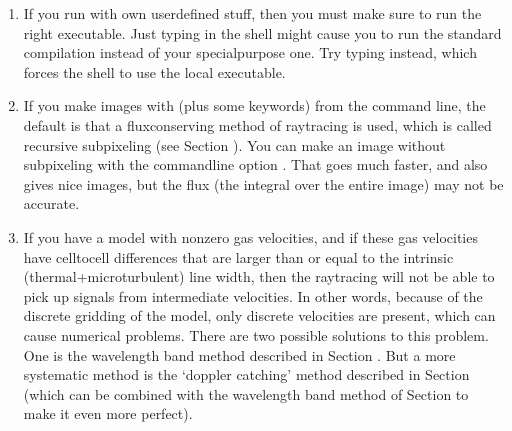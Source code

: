 \documentclass[letterpaper,10pt,english]{sphinxmanual}
\begin{document}
\begin{enumerate}
\item {} 

If you run  with own userdefined stuff, then you must make sure to
run the right executable. Just typing  in the shell might cause
you to run the standard compilation instead of your special\sphinxhyphen{}purpose one. Try
typing  instead, which forces the shell to use the local
executable.

\item {} 

If you make images with  (plus some keywords) from the
command line, the default is that a flux\sphinxhyphen{}conserving method of ray\sphinxhyphen{}tracing is
used, which is called recursive sub\sphinxhyphen{}pixeling (see Section
{\hyperref[\detokenize{imagesspectra:sec-image-refinement}]{}}). You can make an image without sub\sphinxhyphen{}pixeling with
the command\sphinxhyphen{}line option . That goes much faster, and also
gives nice images, but the flux (the integral over the entire image) may
not be accurate.

\item {} 

If you have a model with non\sphinxhyphen{}zero gas velocities, and if these gas velocities
have cell\sphinxhyphen{}to\sphinxhyphen{}cell differences that are larger than or equal to the intrinsic
(thermal+microturbulent) line width, then the ray\sphinxhyphen{}tracing will not be able to
pick up signals from intermediate velocities. In other words, because of the
discrete gridding of the model, only discrete velocities are present, which
can cause numerical problems. There are two possible solutions to this
problem. One is the wavelength band method described in Section
{\hyperref[\detokenize{imagesspectra:sec-wavelength-bands}]{}}.  But a more systematic method is the ‘doppler
catching’ method described in Section {\hyperref[\detokenize{lineradtrans:sec-doppler-catching}]{}} (which can
be combined with the wavelength band method of Section
{\hyperref[\detokenize{imagesspectra:sec-wavelength-bands}]{}} to make it even more perfect).


\end{enumerate}
\end{document}

